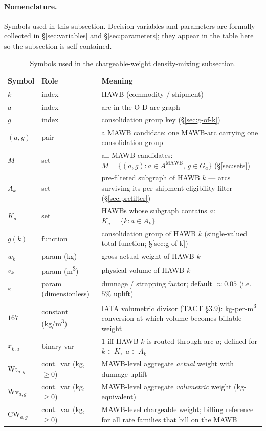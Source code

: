 \documentclass[11pt,a4paper]{article}
\theoremstyle{definition}
\begin{document}
\paragraph{Nomenclature.}
Symbols used in this subsection. Decision variables and parameters are
formally collected in \S\ref{sec:variables} and \S\ref{sec:parameters}; they
appear in the table here so the subsection is self-contained.
\begin{table}[H]
\centering
\caption{Symbols used in the chargeable-weight density-mixing subsection.}
\label{tab:density-mixing-syms}
\begin{tabular}{p{2.5cm}p{2.2cm}p{8.4cm}}
\toprule
Symbol & Role & Meaning \\
\midrule
$k$ & index & HAWB (commodity / shipment) \\
$a$ & index & arc in the O-D-arc graph \\
$g$ & index & consolidation group key (\S\ref{sec:g-of-k}) \\
$(a, g)$ & pair & a MAWB candidate: one MAWB-arc carrying one consolidation group \\
$M$ & set & all MAWB candidates: $M = \{(a, g) : a \in A^{\text{MAWB}},\, g \in G_a\}$ (\S\ref{sec:sets}) \\
$A_k$ & set & pre-filtered subgraph of HAWB $k$ --- arcs surviving its per-shipment eligibility filter (\S\ref{sec:prefilter}) \\
$K_a$ & set & HAWBs whose subgraph contains $a$: $K_a = \{k : a \in A_k\}$ \\
$g(k)$ & function & consolidation group of HAWB $k$ (single-valued total function; \S\ref{sec:g-of-k}) \\
$w_k$ & param (kg) & gross actual weight of HAWB $k$ \\
$v_k$ & param (m\textsuperscript{3}) & physical volume of HAWB $k$ \\
$\varepsilon$ & param (dimensionless) & dunnage / strapping factor; default $\approx 0.05$ (i.e.\ $5\%$ uplift) \\
$167$ & constant (kg/m\textsuperscript{3}) & IATA volumetric divisor (TACT \S3.9): kg-per-m\textsuperscript{3} conversion at which volume becomes billable weight \\
$x_{k,a}$ & binary var & $1$ iff HAWB $k$ is routed through arc $a$; defined for $k \in K$,\, $a \in A_k$ \\
$\text{Wt}_{a,g}$ & cont.\ var (kg, $\geq 0$) & MAWB-level aggregate \emph{actual} weight with dunnage uplift \\
$\text{Wv}_{a,g}$ & cont.\ var (kg, $\geq 0$) & MAWB-level aggregate \emph{volumetric} weight (kg-equivalent) \\
$\text{CW}_{a,g}$ & cont.\ var (kg, $\geq 0$) & MAWB-level chargeable weight; billing reference for all rate families that bill on the MAWB \\
\bottomrule
\end{tabular}
\end{table}
\end{document}

